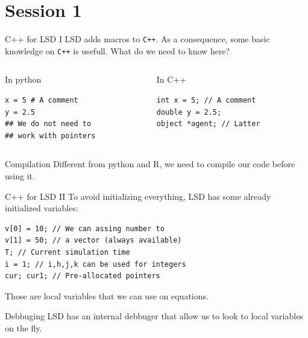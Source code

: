 \documentclass[bigger,aspectratio=169]{beamer}
\begin{document}
\section{Session 1}
\label{sec:org9ff7e66}

\begin{frame}[label={sec:orgdd658fe},fragile]{C++ for LSD I}
 LSD adds macros to \texttt{C++}.
As a consequence, some basic knowledge on \texttt{C++} is usefull.
What do we need to know here?
\begin{columns}
\begin{column}{0.4\columnwidth}
\begin{block}{In python}
\begin{verbatim}
x = 5 # A comment
y = 2.5
## We do not need to
## work with pointers
\end{verbatim}
\end{block}
\end{column}
\begin{column}{0.4\columnwidth}
\begin{block}{In C++}
\begin{verbatim}
int x = 5; // A comment
double y = 2.5;
object *agent; // Latter
\end{verbatim}
\end{block}
\end{column}
\end{columns}
\begin{block}{Compilation}
Different from python and R, we need to \alert{compile} our code before using it.
\end{block}
\end{frame}
\begin{frame}[label={sec:org6dba465},fragile]{C++ for LSD II}
 To avoid initializing everything, LSD has some already initialized variables:

\begin{verbatim}
v[0] = 10; // We can assing number to
v[1] = 50; // a vector (always available)
T; // Current simulation time
i = 1; // i,h,j,k can be used for integers
cur; cur1; // Pre-allocated pointers
\end{verbatim}

Those are \alert{local variables} that we can use on equations.
\begin{block}{Debbuging}
LSD has an internal debbuger that allow us to look to local variables on the fly.
\end{block}
\end{frame}
\end{document}
